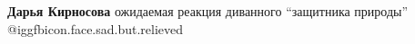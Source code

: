 \begin{itemize}
\begin{itemize}
\begin{itemize}
\end{itemize} %

\textbf{Дарья Кирносова} ожидаемая реакция диванного \enquote{защитника природы} @igg{fbicon.face.sad.but.relieved} 

\end{itemize} %

\end{itemize} %
